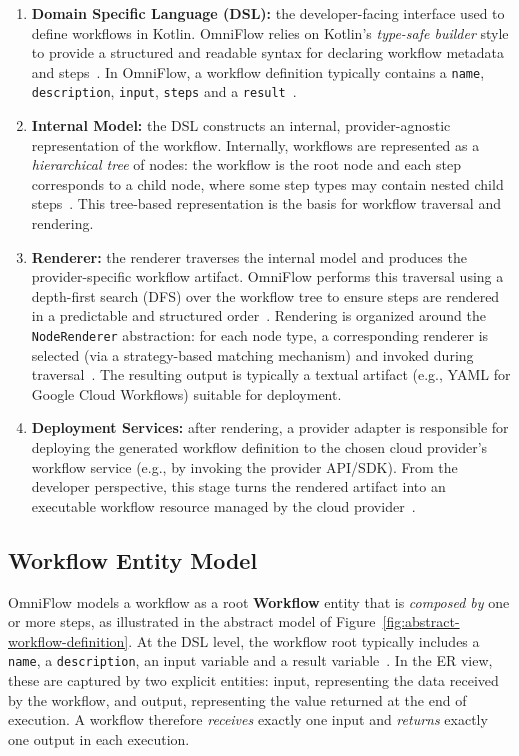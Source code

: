 \begin{enumerate}
	\item \textbf{Domain Specific Language (DSL):} the developer-facing interface used to define workflows in Kotlin. OmniFlow relies on Kotlin’s \emph{type-safe builder} style to provide a structured and readable syntax for declaring workflow metadata and steps~\cite{type-safe_builders}. In OmniFlow, a workflow definition typically contains a \texttt{name}, \texttt{description}, \texttt{input}, \texttt{steps} and a \texttt{result}~\cite{silva2025advanced}.

	\item \textbf{Internal Model:} the DSL constructs an internal, provider-agnostic representation of the workflow. Internally, workflows are represented as a \emph{hierarchical tree} of nodes: the workflow is the root node and each step corresponds to a child node, where some step types may contain nested child steps~\cite{silva2025advanced}. This tree-based representation is the basis for workflow traversal and rendering.

	\item \textbf{Renderer:} the renderer traverses the internal model and produces the provider-specific workflow artifact. OmniFlow performs this traversal using a depth-first search (DFS) over the workflow tree to ensure steps are rendered in a predictable and structured order~\cite{silva2025advanced}. Rendering is organized around the \texttt{NodeRenderer} abstraction: for each node type, a corresponding renderer is selected (via a strategy-based matching mechanism) and invoked during traversal~\cite{silva2025advanced}. The resulting output is typically a textual artifact (e.g., YAML for Google Cloud Workflows) suitable for deployment.

	\item \textbf{Deployment Services:} after rendering, a provider adapter is responsible for deploying the generated workflow definition to the chosen cloud provider’s workflow service (e.g., by invoking the provider API/SDK). From the developer perspective, this stage turns the rendered artifact into an executable workflow resource managed by the cloud provider~\cite{costa2023omniflow}.
\end{enumerate}

\subsection{Workflow Entity Model}
OmniFlow models a workflow as a root \textbf{Workflow} entity that is \emph{composed by} one or more steps, as illustrated in the abstract model of Figure~\ref{fig:abstract-workflow-definition}. At the DSL level, the workflow root typically includes a \texttt{name}, a \texttt{description}, an input variable and a result variable~\cite{silva2025advanced}. In the ER view, these are captured by two explicit entities: input, representing the data received by the workflow, and output, representing the value returned at the end of execution. A workflow therefore \emph{receives} exactly one input and \emph{returns} exactly one output in each execution.


